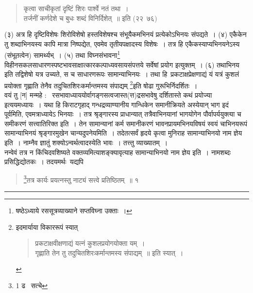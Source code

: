 \documentclass[11pt, openany]{book}
\begin{document}
\begin{quote}
{\qt कृत्वा साचीकृतां दृष्टिं शिरः पार्श्वे नतं तथा~।\\
तर्जनीं कर्णदेशे च बुधः शब्दं विनिर्दिशेत्~॥} इति (२२\textendash\ ७६)
\end{quote}

(३) अत्र हि दृष्टिविशेषः शिरोविशेषो हस्तविशेषश्च संभूयैकमभिनयं प्रत्येकोऽभिनयः संपद्यते~। (४) एकैकेन तु शब्दाभिनयस्य कापि मात्रा निष्पद्येत, एवमेव तृतीयपक्षादस्य विशेषः~। तत्र हि एकैकस्याप्यभिनयनेऽस्य (संभूतत्वेन) सामर्थ्यभ्~। (५) तथा विघ्नसंभावना\renewcommand{\thefootnote}{*}\footnote{षष्ठेऽध्याये रससूत्रव्याख्याने सप्तविघ्ना उक्ताः~।} विहीनसकलसाधारणस्पष्टभावसाक्षात्कारकल्पाध्यवसायसंपत्तये सर्वेषां प्रयोग इत्युक्तम्~। (६) तथाभिनय इति तद्विशेषो यत्र उच्यते, स च साधारणरूपः सामान्याभिनयः~। तथा हि\textendash\ प्रकटाक्षप्रेक्षणाद्यं यं यत्रं कुशलं प्रयोक्ता गृह्णाति तेनैव तदुचितशिरःकर्मान्तमस्य संपाद्यम् \renewcommand{\thefootnote}{$\dagger$}\footnote{इदमार्याया विकाररूपं स्यात्\textendash
\begin{quote}
{\qt प्रकटाक्षवीक्षणाद्यं यत्नं कुशलप्रयोगयोक्ता यम्~। \\
 गृह्णाति तेन तु तदुचितशिरःकर्मान्तमस्य संपाद्यम्~॥} इति स्यात्~।
\end{quote}}इति षोढा गुरूभिर्निदर्शितः~।\\

वयं तु [न] मन्महे : \textendash\ रसभावाध्याययोर्वागङ्गसत्वजास्त(त्त)द्रसभावेषु दर्शितास्ते कथं प्रयोज्या इत्ययमध्यायः~। यथा हि किराटगृहाद् गन्धद्रव्याण्यानीय गान्धिकेन समानीक्रियते अस्येयान् भाग इदं पूर्वमिति, एवमत्राध्यायेऽ भिनयाः~। तत्र श्रृङ्गारस्य प्राधान्यात् तत्रैवाभिनयानां भागयोगेन पौर्वापर्ययुक्त्या च समीकरणं सत्त्वातिरिक्त इति~। तेन सामान्यानां कर्म समानीकरणं भावनप्रायमभिनयविषयं स्वयं चाभिनयरूपं सामान्याभिनयं श्रृङ्गारमुखेन चान्यदुपनेयमिति~। तदेतत्सर्वं हृदये कृत्वा मुनिराह सामान्याभिनयो नाम ज्ञेय इति~। नाम्नैव ज्ञातुं शक्योऽन्वर्थत्वादस्येति भावः~। तत्त्तु व्याख्यातम्~। \\

नन्वेवं तत्र न किंचिदवशिष्यते वक्तव्यमित्याशङ्क्यावृत्याह सामान्याभिनयो नाम ज्ञेय इति~। नामशब्दः प्रसिद्धिद्योतकः~। तदयमर्थः\textendash\ यद्यपि

\newpage

\begin{quote}
{\na \renewcommand{\thefootnote}{1}\footnote{1 ढ \textendash\ सत्चे }तत्र कार्यः प्रयत्नस्तु नाट्यं सत्त्वे प्रतिष्ठितम्~॥ १}
\end{quote}

\hrule
\end{document}
